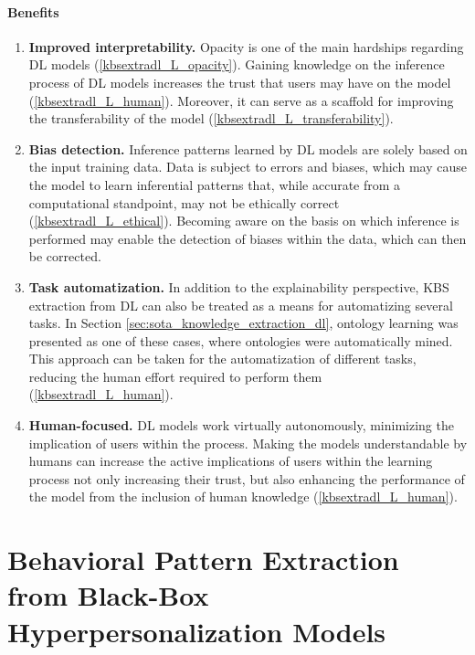 \paragraph{Benefits}
\begin{enumerate} [start=1,label={\bfseries B\arabic*.}]
    \item \textbf{Improved interpretability.}\label{kbsextradl_B_interpretability} Opacity is one of the main hardships regarding DL models (\ref{kbsextradl_L_opacity}). Gaining knowledge on the inference process of DL models increases the trust that users may have on the model (\ref{kbsextradl_L_human}). Moreover, it can serve as a scaffold for improving the transferability of the model (\ref{kbsextradl_L_transferability}).
    
    \item \textbf{Bias detection.}\label{kbsextradl_B_bias} Inference patterns learned by DL models are solely based on the input training data. Data is subject to errors and biases, which may cause the model to learn inferential patterns that, while accurate from a computational standpoint, may not be ethically correct (\ref{kbsextradl_L_ethical}). Becoming aware on the basis on which inference is performed may enable the detection of biases within the data, which can then be corrected.
    
    \item \textbf{Task automatization.}\label{kbsextradl_B_automatization} In addition to the explainability perspective, KBS extraction from DL can also be treated as a means for automatizing several tasks. In Section \ref{sec:sota_knowledge_extraction_dl}, ontology learning was presented as one of these cases, where ontologies were automatically mined. This approach can be taken for the automatization of different tasks, reducing the human effort required to perform them (\ref{kbsextradl_L_human}).
    
    \item \textbf{Human-focused.}\label{kbsextradl_B_human} DL models work virtually autonomously, minimizing the implication of users within the process. Making the models understandable by humans can increase the active implications of users within the learning process not only increasing their trust, but also enhancing the performance of the model from the inclusion of human knowledge (\ref{kbsextradl_L_human}). 
\end{enumerate}
\section{Behavioral Pattern Extraction from Black-Box Hyperpersonalization Models}\label{6_sec:mas_bbhos_general}

